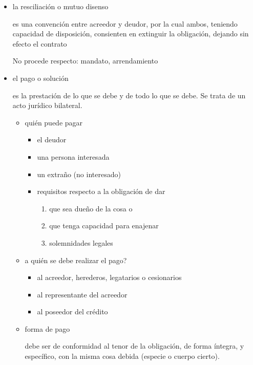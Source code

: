 \documentclass[]{article}
\providecommand{\tightlist}{%
  \setlength{\itemsep}{0pt}\setlength{\parskip}{0pt}}
\begin{document}
\begin{itemize}
  \begin{itemize}
  \item
    la resciliación o mutuo disenso

    es una convención entre acreedor y deudor, por la cual ambos,
    teniendo capacidad de disposición, consienten en extinguir la
    obligación, dejando sin efecto el contrato

    No procede respecto: mandato, arrendamiento
  \item
    el pago o solución

    es la prestación de lo que se debe y de todo lo que se debe. Se
    trata de un acto jurídico bilateral.

    \begin{itemize}
    \item
      quién puede pagar

      \begin{itemize}
      \tightlist
      \item
        el deudor
      \item
        una persona interesada
      \item
        un extraño (no interesado)
      \item
        requisitos respecto a la obligación de dar

        \begin{enumerate}
        \def\labelenumi{\arabic{enumi}.}
        \tightlist
        \item
          que sea dueño de la cosa o
        \item
          que tenga capacidad para enajenar
        \item
          solemnidades legales
        \end{enumerate}
      \end{itemize}
    \item
      a quién se debe realizar el pago?

      \begin{itemize}
      \tightlist
      \item
        al acreedor, herederos, legatarios o cesionarios
      \item
        al representante del acreedor
      \item
        al poseedor del crédito
      \end{itemize}
    \item
      forma de pago

      debe ser de conformidad al tenor de la obligación, de forma
      íntegra, y específico, con la misma cosa debida (especie o cuerpo
      cierto).


\end{itemize}
\end{itemize}
\end{itemize}
\end{document}
